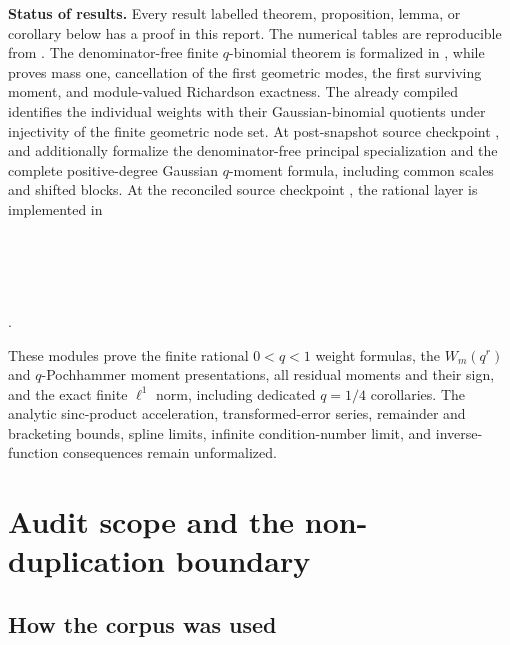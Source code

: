 \documentclass[11pt]{article}
\theoremstyle{definition}
\theoremstyle{remark}
\begin{document}
\medskip
\noindent\textbf{Status of results.}
Every result labelled theorem, proposition, lemma, or corollary below has a proof
in this report. The numerical tables are reproducible from
.  The denominator-free finite
\(q\)-binomial theorem is formalized in , while
 proves mass one, cancellation of the first
geometric modes, the first surviving moment, and module-valued Richardson
exactness.  The already compiled 
identifies the individual weights with their Gaussian-binomial quotients under
injectivity of the finite geometric node set.  At post-snapshot source
checkpoint ,
 and
 additionally formalize the
denominator-free principal specialization and the complete positive-degree
Gaussian \(q\)-moment formula, including common scales and shifted blocks.
At the reconciled source checkpoint
,
the rational layer is implemented in
\begin{center}
\\
\\
\\
\\
.
\end{center}
These modules prove the finite rational
\(0<q<1\) weight formulas, the \(W_m(q^r)\) and \(q\)-Pochhammer moment
presentations, all residual moments and their sign, and the exact finite
\(\ell^1\) norm, including dedicated \(q=1/4\) corollaries.  The
analytic sinc-product acceleration, transformed-error series, remainder and
bracketing bounds, spline limits, infinite condition-number limit, and
inverse-function consequences remain unformalized.

\tableofcontents

\section{Audit scope and the non-duplication boundary}

\subsection{How the corpus was used}
\end{document}
